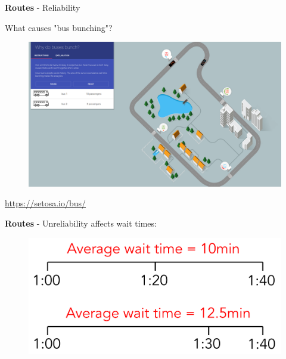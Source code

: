 \documentclass[aspectratio=169]{beamer}
\begin{document}
\begin{frame}
	
	\textbf{Routes} - Reliability
	
	\vspace{2mm}
	
	What causes "bus bunching"?
	
	\begin{figure}
		\centering
		\includegraphics[width=0.8\linewidth]{images/bus-bunching.png}
	\end{figure}
	
	
	\tiny \url{https://setosa.io/bus/}
	
\end{frame}



\begin{frame}
	
	\textbf{Routes} - Unreliability affects wait times:
	
	\vspace{4mm}
	
	
	\begin{figure}
		\centering
		\includegraphics[width=0.6\linewidth]{images/wait_time.png}
	\end{figure}
	
	
\end{frame}
\end{document}
